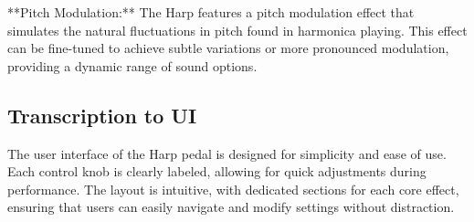 **Pitch Modulation:**  
The Harp features a pitch modulation effect that simulates the natural fluctuations in pitch found in harmonica playing. This effect can be fine-tuned to achieve subtle variations or more pronounced modulation, providing a dynamic range of sound options.

\subsection{Transcription to UI}
The user interface of the Harp pedal is designed for simplicity and ease of use. Each control knob is clearly labeled, allowing for quick adjustments during performance. The layout is intuitive, with dedicated sections for each core effect, ensuring that users can easily navigate and modify settings without distraction.
